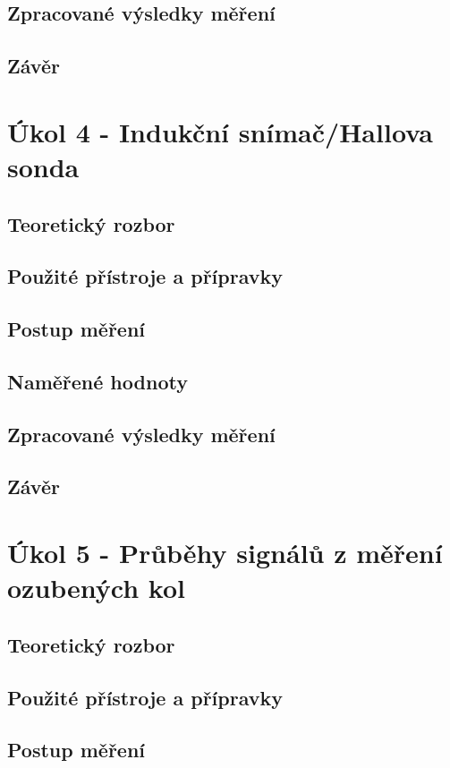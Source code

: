 \documentclass{protokol}
\begin{document}
    \subsection{Zpracované výsledky měření}
    \subsection{Závěr}

\pagebreak

\section{Úkol 4 - Indukční snímač/Hallova sonda}
    \subsection{Teoretický rozbor}
    \subsection{Použité přístroje a přípravky}
    \subsection{Postup měření}
    \subsection{Naměřené hodnoty}
    \subsection{Zpracované výsledky měření}
    \subsection{Závěr}
\pagebreak

\section{Úkol 5 - Průběhy signálů z měření ozubených kol}
    \subsection{Teoretický rozbor}
    \subsection{Použité přístroje a přípravky}
    \subsection{Postup měření}
\end{document}

